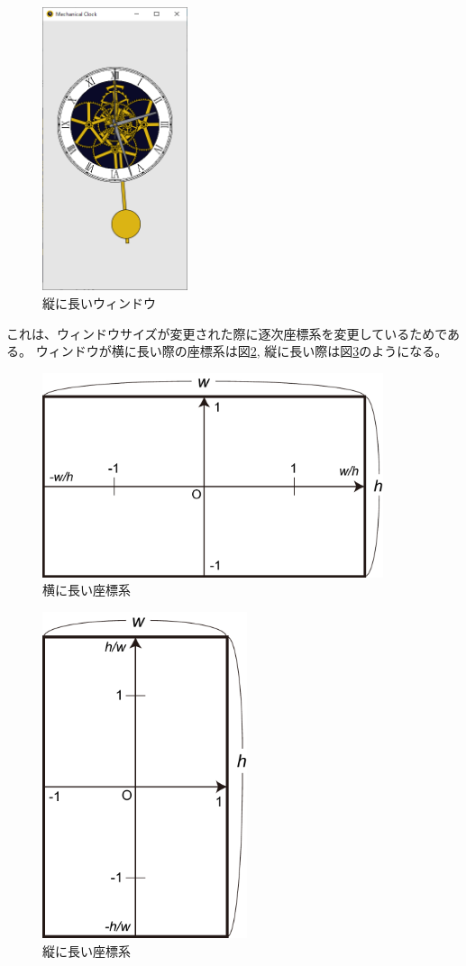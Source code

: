 \documentclass[a4j,titlepage]{jsarticle}
\begin{document}
\begin{figure}[H]
  \centering
  \includegraphics[width=4.25cm]{result3.png}
  \caption{縦に長いウィンドウ}
  \label{fig:res3}
\end{figure}

これは、ウィンドウサイズが変更された際に逐次座標系を変更しているためである。
ウィンドウが横に長い際の座標系は図\ref{fig:frame1}, 縦に長い際は図\ref{fig:frame2}のようになる。

\begin{figure}[H]
  \centering
  \includegraphics[width=10cm]{座標系1.pdf}
  \caption{横に長い座標系}
  \label{fig:frame1}
\end{figure}

\begin{figure}[H]
  \centering
  \includegraphics[width=6cm]{座標系2.pdf}
  \caption{縦に長い座標系}
  \label{fig:frame2}
\end{figure}
\end{document}

